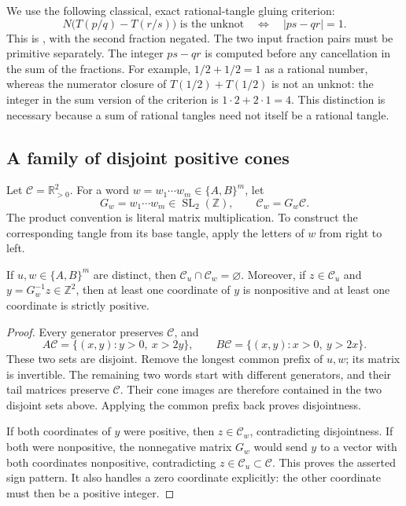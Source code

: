 We use the following classical, exact rational-tangle gluing criterion:
\begin{equation}
 N\bigl(T(p/q)-T(r/s)\bigr)\text{ is the unknot}
 \quad\Longleftrightarrow\quad |ps-qr|=1.
 \label{eq:rational-unknot-gluing}
\end{equation}
This is \cite[Theorem~5]{KauffmanLambropoulouHard}, with the second fraction
negated.  The two input fraction pairs must be primitive separately.
The integer $ps-qr$ is computed before any cancellation in the sum of the
fractions.  For example, $1/2+1/2=1$ as a rational number, whereas the
numerator closure of $T(1/2)+T(1/2)$ is not an unknot: the integer in the
sum version of the criterion is $1\cdot2+2\cdot1=4$.
This distinction is necessary because a sum of rational tangles need not
itself be a rational tangle.

\subsection{A family of disjoint positive cones}

Let $\mathcal C=\mathbb R_{>0}^{2}$.  For a word
$w=w_1\cdots w_m\in\{A,B\}^m$, let
\[
 G_w=w_1\cdots w_m\in\operatorname{SL}_2(\mathbb Z),
 \qquad \mathcal C_w=G_w\mathcal C.
\]
The product convention is literal matrix multiplication.  To construct
the corresponding tangle from its base tangle, apply the letters of $w$
from right to left.

\begin{lemma}
\label{lem:rational-disjoint-cones}
If $u,w\in\{A,B\}^m$ are distinct, then
$\mathcal C_u\cap\mathcal C_w=\varnothing$.
Moreover, if $z\in\mathcal C_u$ and
$y=G_w^{-1}z\in\mathbb Z^2$, then at least one coordinate of $y$ is
nonpositive and at least one coordinate is strictly positive.
\end{lemma}

\begin{proof}
Every generator preserves $\mathcal C$, and
\[
 A\mathcal C=\{(x,y):y>0,\ x>2y\},\qquad
 B\mathcal C=\{(x,y):x>0,\ y>2x\}.
\]
These two sets are disjoint.  Remove the longest common prefix of $u,w$;
its matrix is invertible.  The remaining two words start with different
generators, and their tail matrices preserve $\mathcal C$.  Their cone
images are therefore contained in the two disjoint sets above.  Applying
the common prefix back proves disjointness.

If both coordinates of $y$ were positive, then $z\in\mathcal C_w$,
contradicting disjointness.  If both were nonpositive, the nonnegative
matrix $G_w$ would send $y$ to a vector with both coordinates nonpositive,
contradicting $z\in\mathcal C_u\subset\mathcal C$.  This proves the
asserted sign pattern.  It also handles a zero coordinate explicitly:
the other coordinate must then be a positive integer.
\end{proof}

